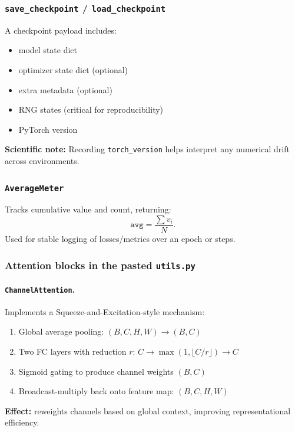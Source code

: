 \subsubsection*{\texttt{save\_checkpoint} / \texttt{load\_checkpoint}}
A checkpoint payload includes:
\begin{itemize}
  \item model state dict
  \item optimizer state dict (optional)
  \item extra metadata (optional)
  \item RNG states (critical for reproducibility)
  \item PyTorch version
\end{itemize}
\textbf{Scientific note:} Recording \texttt{torch\_version} helps interpret any numerical drift across environments.

\subsubsection*{\texttt{AverageMeter}}
Tracks cumulative value and count, returning:
\[
\texttt{avg}=\frac{\sum v_i}{N}.
\]
Used for stable logging of losses/metrics over an epoch or steps.

\subsubsection*{Attention blocks in the pasted \texttt{utils.py}}
\paragraph{\texttt{ChannelAttention}.}
Implements a Squeeze-and-Excitation-style mechanism:
\begin{enumerate}
  \item Global average pooling: \((B,C,H,W)\rightarrow(B,C)\)
  \item Two FC layers with reduction \(r\): \(C \rightarrow \max(1,\lfloor C/r \rfloor)\rightarrow C\)
  \item Sigmoid gating to produce channel weights \((B,C)\)
  \item Broadcast-multiply back onto feature map: \((B,C,H,W)\)
\end{enumerate}
\textbf{Effect:} reweights channels based on global context, improving representational efficiency.

